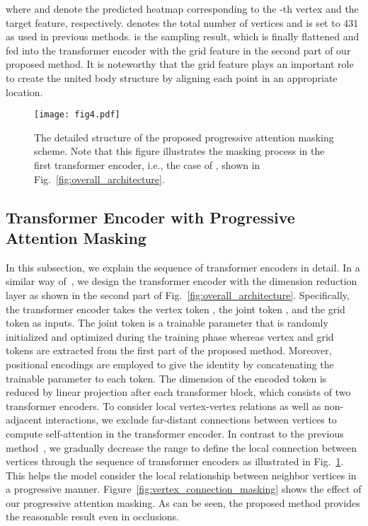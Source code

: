 \documentclass[10pt,twocolumn,letterpaper]{article}
\begin{document}
where  and  denote the predicted heatmap corresponding to the -th vertex and the target feature, respectively.  denotes the total number of vertices and is set to 431 as used in previous methods.  is the sampling result, which is finally flattened and fed into the transformer encoder with the grid feature in the second part of our proposed method.
It is noteworthy that the grid feature plays an important role to create the united body structure by aligning each point in an appropriate location.

\begin{figure}
\centering
\vspace{-4mm}
\centerline{\texttt{[image: fig4.pdf]}}
\caption{\label{fig:attention_masking} The detailed structure of the proposed progressive attention masking scheme. Note that this figure illustrates the masking process in the first transformer encoder, i.e., the case of , shown in Fig.~\ref{fig:overall_architecture}.
}
\vspace{-1mm}
\end{figure}

\subsection{Transformer Encoder with Progressive Attention Masking}
In this subsection, we explain the sequence of transformer encoders in detail. In a similar way of~\cite{Lin21, Lin21_ICCV}, we design the transformer encoder with the dimension reduction layer as shown in the second part of Fig.~\ref{fig:overall_architecture}. 
Specifically, the transformer encoder takes the vertex token , the joint token , and the grid token  as inputs.
The joint token is a trainable parameter that is randomly initialized and optimized during the training phase whereas vertex and grid tokens are extracted from the first part of the proposed method.
Moreover, positional encodings are employed to give the identity by concatenating the trainable parameter to each token. The dimension of the encoded token is reduced by linear projection after each transformer block, which consists of two transformer encoders. To consider local vertex-vertex relations as well as non-adjacent interactions, we exclude far-distant connections between vertices to compute self-attention in the transformer encoder. In contrast to the previous method~\cite{Cho22}, we gradually decrease the range to define the local connection between vertices through the sequence of transformer encoders as illustrated in Fig.~\ref{fig:attention_masking}. This helps the model consider the local relationship between neighbor vertices in a progressive manner. Figure~\ref{fig:vertex_connection_masking} shows the effect of our progressive attention masking. As can be seen, the proposed method provides the reasonable result even in occlusions.
\end{document}
